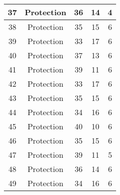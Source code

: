 \documentclass[results.tex]{subfiles}
\begin{document}
\begin{center}
\begin{tabular}{| c || c | c | c | c |}
            \hline
            37                      & Protection                   & 36                     & 14                      & 4                    \\
            \hline
            38                      & Protection                   & 35                     & 15                      & 6                    \\
            \hline
            39                      & Protection                   & 33                     & 17                      & 6                    \\
            \hline
            40                      & Protection                   & 37                     & 13                      & 6                    \\
            \hline
            41                      & Protection                   & 39                     & 11                      & 6                    \\
            \hline
            42                      & Protection                   & 33                     & 17                      & 6                    \\
            \hline
            43                      & Protection                   & 35                     & 15                      & 6                    \\
            \hline
            44                      & Protection                   & 34                     & 16                      & 6                    \\
            \hline
            45                      & Protection                   & 40                     & 10                      & 6                    \\
            \hline
            46                      & Protection                   & 35                     & 15                      & 6                    \\
            \hline
            47                      & Protection                   & 39                     & 11                      & 5                    \\
            \hline
            48                      & Protection                   & 36                     & 14                      & 6                    \\
            \hline
            49                      & Protection                   & 34                     & 16                      & 6                    \\
            \hline
        \end{tabular}
    \end{center}
\end{document}
